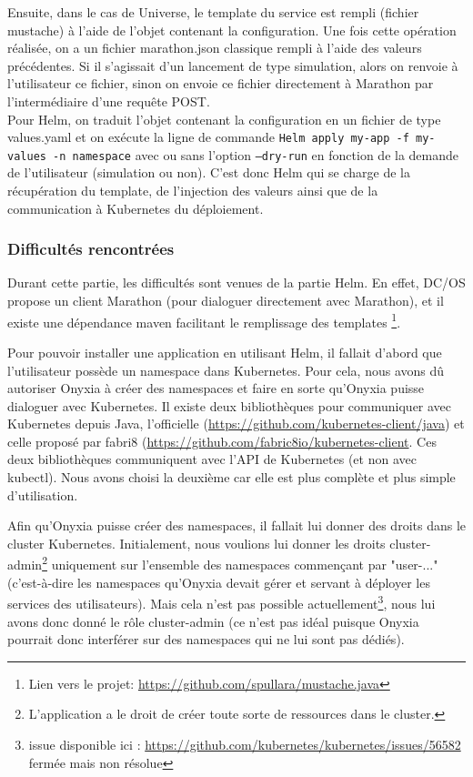 \documentclass[11pt,fleqn]{book} %
\begin{document}
Ensuite, dans le cas de Universe, le template du service est rempli (fichier mustache) à l'aide de l'objet contenant la configuration. Une fois cette opération réalisée, on a un fichier marathon.json classique rempli à l'aide des valeurs précédentes. Si il s'agissait d'un lancement de type simulation, alors on renvoie à l'utilisateur ce fichier, sinon on envoie ce fichier directement à Marathon par l'intermédiaire d'une requête POST.\\

Pour Helm, on traduit l'objet contenant la configuration en un fichier de type values.yaml et on exécute la ligne de commande \texttt{Helm apply my-app -f my-values -n namespace} avec ou sans l'option \texttt{--dry-run} en fonction de la demande de l'utilisateur (simulation ou non). C'est donc Helm qui se charge de la récupération du template, de l'injection des valeurs ainsi que de la communication à Kubernetes du déploiement.

\subsubsection{Difficultés rencontrées}
Durant cette partie, les difficultés sont venues de la partie Helm. En effet, DC/OS propose un client Marathon (pour dialoguer directement avec Marathon), et il existe une dépendance maven facilitant le remplissage des templates \footnote{Lien vers le projet: \url{https://github.com/spullara/mustache.java}}.\newline

Pour pouvoir installer une application en utilisant Helm, il fallait d'abord que l'utilisateur possède un namespace dans Kubernetes. Pour cela, nous avons dû autoriser Onyxia à créer des namespaces et faire en sorte qu'Onyxia puisse dialoguer avec Kubernetes. Il existe deux bibliothèques pour communiquer avec Kubernetes depuis Java, l'officielle (\url{https://github.com/kubernetes-client/java}) et celle proposé par fabri8 (\url{https://github.com/fabric8io/kubernetes-client}. Ces deux bibliothèques communiquent avec l'API de Kubernetes (et non avec kubectl). Nous avons choisi la deuxième car elle est plus complète et plus simple d'utilisation. \newline

Afin qu'Onyxia puisse créer des namespaces, il fallait lui donner des droits dans le cluster Kubernetes. Initialement, nous voulions lui donner les droits cluster-admin\footnote{L'application a le droit de créer toute sorte de ressources dans le cluster.} uniquement sur l'ensemble des namespaces commençant par "user-..." (c'est-à-dire les namespaces qu'Onyxia devait gérer et servant à déployer les services des utilisateurs). Mais cela n'est pas possible actuellement\footnote{issue disponible ici : \url{https://github.com/kubernetes/kubernetes/issues/56582} fermée mais non résolue}, nous lui avons donc donné le rôle cluster-admin (ce n'est pas idéal puisque Onyxia pourrait donc interférer sur des namespaces qui ne lui sont pas dédiés).
\end{document}
